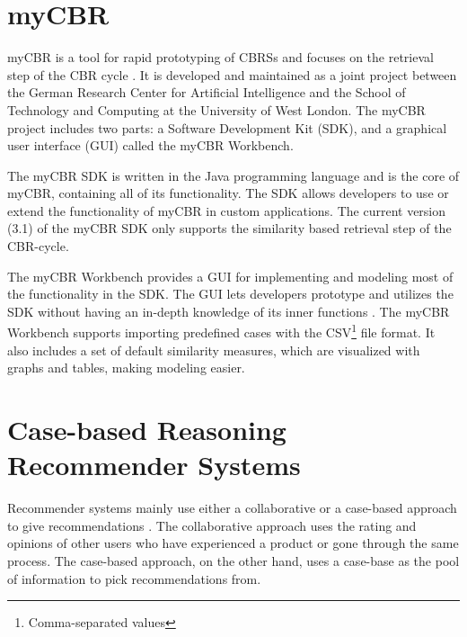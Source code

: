 \section{myCBR}

myCBR is a tool for rapid prototyping of CBRSs and focuses on the retrieval step of the CBR cycle \cite{Stahl2008}. It is developed and maintained as a joint project between the German Research Center for Artificial Intelligence and the School of Technology and Computing at the University of West London. The myCBR project includes two parts: a Software Development Kit (SDK), and a graphical user interface (GUI) called the myCBR Workbench. 

The myCBR SDK is written in the Java programming language and is the core of myCBR, containing all of its functionality. The SDK allows developers to use or extend the functionality of myCBR in custom applications. The current version (3.1) of the myCBR SDK only supports the similarity based retrieval step of the CBR-cycle.

The myCBR Workbench provides a GUI for implementing and modeling most of the functionality in the SDK. The GUI lets developers prototype and utilizes the SDK without having an in-depth knowledge of its inner functions \cite{bach2014knowledge}. The myCBR Workbench supports importing predefined cases with the CSV\footnote{Comma-separated values} file format. It also includes a set of default similarity measures, which are visualized with graphs and tables, making modeling easier.

\section{Case-based Reasoning Recommender Systems}\label{sec:case_based_recommender_systems}

Recommender systems mainly use either a collaborative or a case-based approach to give recommendations \cite{bridge2005case}. The collaborative approach uses the rating and opinions of other users who have experienced a product or gone through the same process. The case-based approach, on the other hand, uses a case-base as the pool of information to pick recommendations from.

